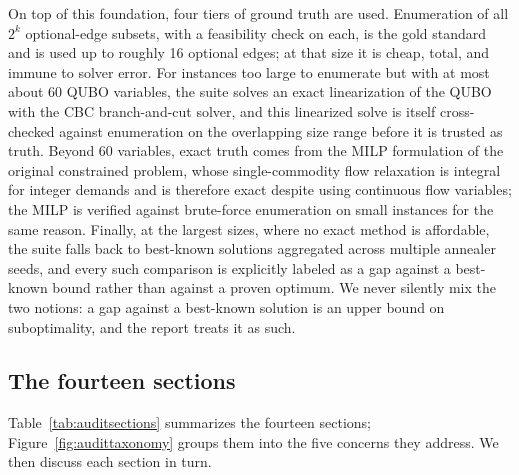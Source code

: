 On top of this foundation, four tiers of ground truth are used.
Enumeration of all $2^k$ optional-edge subsets, with a feasibility check on
each, is the gold standard and is used up to roughly 16 optional edges; at
that size it is cheap, total, and immune to solver error. For instances too
large to enumerate but with at most about 60 QUBO variables, the suite
solves an exact linearization of the QUBO with the CBC branch-and-cut
solver, and this linearized solve is itself cross-checked against
enumeration on the overlapping size range before it is trusted as truth.
Beyond 60 variables, exact truth comes from the MILP formulation of the
original constrained problem, whose single-commodity flow relaxation is
integral for integer demands and is therefore exact despite using
continuous flow variables; the MILP is verified against brute-force
enumeration on small instances for the same reason. Finally, at the largest
sizes, where no exact method is affordable, the suite falls back to
best-known solutions aggregated across multiple annealer seeds, and every
such comparison is explicitly labeled as a gap against a best-known bound
rather than against a proven optimum. We never silently mix the two
notions: a gap against a best-known solution is an upper bound on
suboptimality, and the report treats it as such.

\subsection{The fourteen sections}

Table~\ref{tab:auditsections} summarizes the fourteen sections;
Figure~\ref{fig:audittaxonomy} groups them into the five concerns they
address. We then discuss each section in turn.

